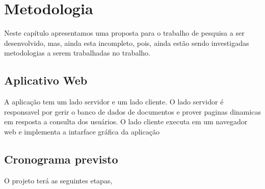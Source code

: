 
\chapter{Metodologia}
\label{sec-projeto}

Neste capítulo apresentamos uma proposta para o trabalho de pesquisa a ser desenvolvido, mas, ainda esta incompleto, pois, ainda estão sendo investigadas metodologias a serem trabalhadas no trabalho. 


\section{Aplicativo Web}
\label{sec-aplicativo}

A aplicação tem um lado servidor e um lado cliente. O lado servidor é responsavel por gerir o banco de dados de documentos e prover paginas dinamicas em resposta a consulta dos usuários. O lado cliente executa em um navegador web e implementa a intarface gráfica da aplicação

\section{Cronograma previsto}
\label{sec-cronograma}

O projeto terá as seguintes etapas, 

